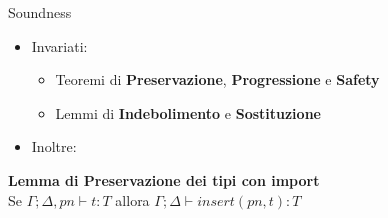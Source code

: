 \begin{frame}{Soundness}
	\begin{itemize}
		\item Invariati:
		\begin{itemize}
			\item Teoremi di \textbf{Preservazione}, \textbf{Progressione} e \textbf{Safety}
			\item Lemmi di \textbf{Indebolimento} e \textbf{Sostituzione}
		\end{itemize}
		\item Inoltre:
	\end{itemize}
	\begin{center}
		\textbf{Lemma di Preservazione dei tipi con import} \\
		Se $\Gamma; \Delta, pn \vdash t : T$ allora $\Gamma; \Delta \vdash insert(pn, t) : T$
	\end{center}
\end{frame}